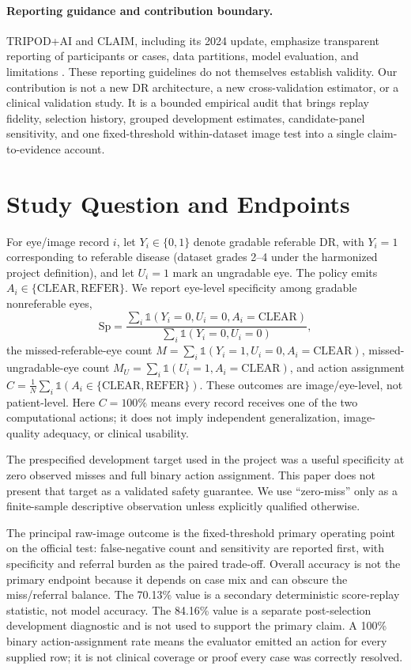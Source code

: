 \documentclass[11pt]{article}
\begin{document}
\paragraph{Reporting guidance and contribution boundary.} TRIPOD+AI and CLAIM, including its 2024 update, emphasize transparent reporting of participants or cases, data partitions, model evaluation, and limitations \cite{tripodai,claim,claim2024}. These reporting guidelines do not themselves establish validity. Our contribution is not a new DR architecture, a new cross-validation estimator, or a clinical validation study. It is a bounded empirical audit that brings replay fidelity, selection history, grouped development estimates, candidate-panel sensitivity, and one fixed-threshold within-dataset image test into a single claim-to-evidence account.

\section{Study Question and Endpoints}
For eye/image record $i$, let $Y_i\in\{0,1\}$ denote gradable referable DR, with $Y_i=1$ corresponding to referable disease (dataset grades 2--4 under the harmonized project definition), and let $U_i=1$ mark an ungradable eye. The policy emits $A_i\in\{\text{CLEAR},\text{REFER}\}$. We report eye-level specificity among gradable nonreferable eyes,
\begin{equation}
\mathrm{Sp}=\frac{\sum_i\mathbb{1}(Y_i=0,U_i=0,A_i=\text{CLEAR})}{\sum_i\mathbb{1}(Y_i=0,U_i=0)},
\end{equation}
the missed-referable-eye count $M=\sum_i\mathbb{1}(Y_i=1,U_i=0,A_i=\text{CLEAR})$, missed-ungradable-eye count $M_U=\sum_i\mathbb{1}(U_i=1,A_i=\text{CLEAR})$, and action assignment $C=\frac{1}{N}\sum_i\mathbb{1}(A_i\in\{\text{CLEAR},\text{REFER}\})$. These outcomes are image/eye-level, not patient-level. Here $C=100\%$ means every record receives one of the two computational actions; it does not imply independent generalization, image-quality adequacy, or clinical usability.

The prespecified development target used in the project was a useful specificity at zero observed misses and full binary action assignment. This paper does not present that target as a validated safety guarantee. We use ``zero-miss'' only as a finite-sample descriptive observation unless explicitly qualified otherwise.

The principal raw-image outcome is the fixed-threshold primary operating point on the official test: false-negative count and sensitivity are reported first, with specificity and referral burden as the paired trade-off. Overall accuracy is not the primary endpoint because it depends on case mix and can obscure the miss/referral balance. The 70.13\% value is a secondary deterministic score-replay statistic, not model accuracy. The 84.16\% value is a separate post-selection development diagnostic and is not used to support the primary claim. A 100\% binary action-assignment rate means the evaluator emitted an action for every supplied row; it is not clinical coverage or proof every case was correctly resolved.
\end{document}
